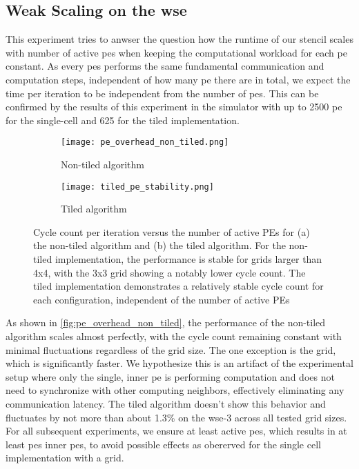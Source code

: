 \subsection{Weak Scaling on the \ac{wse}}
\label{sec:weak_scaling}
This experiment tries to anwser the question how the runtime of our stencil scales with number of active \acp{pe} when keeping the computational workload for each \ac{pe} constant.
As every \acp{pe} performs the same fundamental communication and computation steps, independent of how many \ac{pe} there are in total,  we expect the time per iteration to be independent from the number of \acp{pe}.
This can be confirmed by the results of this experiment in the simulator with up to \num{2500} \ac{pe} for the single-cell and \num{625} for the tiled implementation.

\begin{figure}[h]
    \centering
    \begin{subfigure}[b]{0.48\textwidth}
        \centering
        \texttt{[image: pe\_overhead\_non\_tiled.png]}
        \caption{Non-tiled algorithm}
        \label{fig:pe_overhead_non_tiled}
    \end{subfigure}
    \hfill
    \begin{subfigure}[b]{0.48\textwidth}
        \centering
        \texttt{[image: tiled\_pe\_stability.png]}
        \caption{Tiled algorithm}
        \label{fig:tiled_pe_stability}
    \end{subfigure}
    \caption{Cycle count per iteration versus the number of active PEs for (a) the non-tiled algorithm and (b) the tiled algorithm. For the non-tiled implementation, the performance is stable for grids larger than 4x4, with the 3x3 grid showing a notably lower cycle count. The tiled implementation demonstrates a relatively stable cycle count for each configuration, independent of the number of active PEs}
    \label{fig:pe_overhead}
\end{figure}

As shown in \autoref{fig:pe_overhead_non_tiled}, the performance of the non-tiled algorithm scales almost perfectly, with the cycle count remaining constant with minimal fluctuations regardless of the grid size. The one exception is the  grid, which is significantly faster. We hypothesize this is an artifact of the experimental setup where only the single, inner \ac{pe} is performing computation and does not need to synchronize with other computing neighbors, effectively eliminating any communication latency.
The tiled algorithm doesn't show this behavior and fluctuates by not more than about 1.3\% on the \ac{wse}-3 across all tested grid sizes.
For all subsequent experiments, we ensure at least  active \acp{pe}, which results in at least  \acp{pe} inner \acp{pe}, to avoid possible effects as obererved for the single cell implementation with a  grid. 


